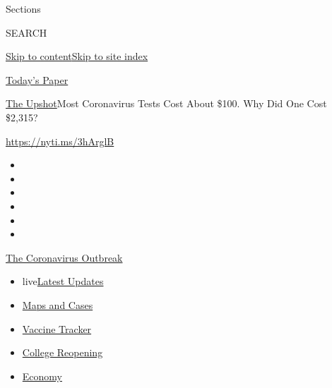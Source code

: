Sections

SEARCH

\protect\hyperlink{site-content}{Skip to
content}\protect\hyperlink{site-index}{Skip to site index}

\href{https://myaccount.nytimes.com/auth/login?response_type=cookie\&client_id=vi}{}

\href{https://www.nytimes.com/section/todayspaper}{Today's Paper}

\href{/section/upshot}{The Upshot}\textbar{}Most Coronavirus Tests Cost
About \$100. Why Did One Cost \$2,315?

\url{https://nyti.ms/3hArglB}

\begin{itemize}
\item
\item
\item
\item
\item
\item
\end{itemize}

\href{https://www.nytimes.com/news-event/coronavirus?action=click\&pgtype=Article\&state=default\&region=TOP_BANNER\&context=storylines_menu}{The
Coronavirus Outbreak}

\begin{itemize}
\tightlist
\item
  live\href{https://www.nytimes.com/2020/08/04/world/coronavirus-cases.html?action=click\&pgtype=Article\&state=default\&region=TOP_BANNER\&context=storylines_menu}{Latest
  Updates}
\item
  \href{https://www.nytimes.com/interactive/2020/us/coronavirus-us-cases.html?action=click\&pgtype=Article\&state=default\&region=TOP_BANNER\&context=storylines_menu}{Maps
  and Cases}
\item
  \href{https://www.nytimes.com/interactive/2020/science/coronavirus-vaccine-tracker.html?action=click\&pgtype=Article\&state=default\&region=TOP_BANNER\&context=storylines_menu}{Vaccine
  Tracker}
\item
  \href{https://www.nytimes.com/2020/08/02/us/covid-college-reopening.html?action=click\&pgtype=Article\&state=default\&region=TOP_BANNER\&context=storylines_menu}{College
  Reopening}
\item
  \href{https://www.nytimes.com/live/2020/08/04/business/stock-market-today-coronavirus?action=click\&pgtype=Article\&state=default\&region=TOP_BANNER\&context=storylines_menu}{Economy}
\end{itemize}

